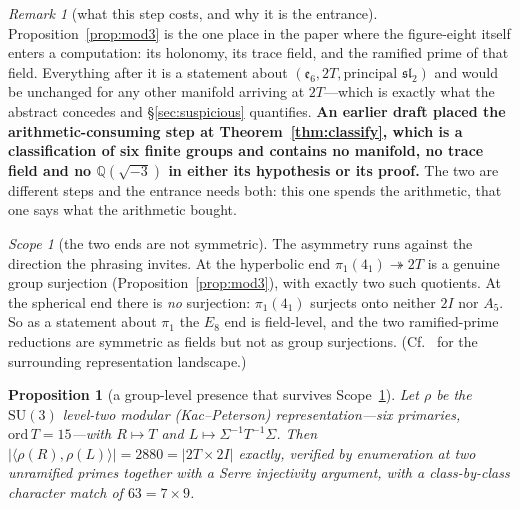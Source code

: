 \documentclass[11pt,reqno]{amsart}
\theoremstyle{plain}
\newtheorem{proposition}[theorem]{Proposition}
\theoremstyle{definition}
\theoremstyle{remark}
\newtheorem{scope}[theorem]{Scope}
\newtheorem{remark}[theorem]{Remark}
\newcommand{\Q}{\mathbb{Q}}
\newcommand{\sll}{\mathfrak{sl}}
\newcommand{\ee}{\mathfrak{e}}
\begin{document}
\begin{remark}[what this step costs, and why it is the entrance]\label{rk:entrance-cost}
Proposition~\ref{prop:mod3} is the one place in the paper where the figure-eight itself
enters a computation: its holonomy, its trace field, and the ramified prime of that
field. Everything after it is a statement about $(\ee_6,2T,\text{principal }\sll_2)$ and
would be unchanged for any other manifold arriving at $2T$---which is exactly what the
abstract concedes and \S\ref{sec:suspicious} quantifies. \textbf{An earlier draft placed
the arithmetic-consuming step at Theorem~\ref{thm:classify}, which is a classification of
six finite groups and contains no manifold, no trace field and no $\Q(\sqrt{-3})$ in
either its hypothesis or its proof.} The two are different steps and the entrance needs
both: this one spends the arithmetic, that one says what the arithmetic bought.
\end{remark}

\begin{scope}[the two ends are not symmetric]\label{sc:asym}
The asymmetry runs against the direction the phrasing invites. At the hyperbolic end
$\pi_1(4_1)\twoheadrightarrow 2T$ is a genuine group surjection
(Proposition~\ref{prop:mod3}), with exactly two such
quotients. At the spherical end there is \emph{no} surjection: $\pi_1(4_1)$ surjects
onto neither $2I$ nor $A_5$. So as a statement about $\pi_1$ the $E_8$ end is
field-level, and the two ramified-prime reductions are symmetric as fields but not as
group surjections. (Cf.~\cite{Stuebner} for the surrounding representation landscape.)
\end{scope}

\begin{proposition}[a group-level presence that survives Scope~\ref{sc:asym}]\label{prop:2880}
Let $\rho$ be the $\mathrm{SU}(3)$ level-two modular (Kac--Peterson) representation---six
primaries, $\mathrm{ord}\,T=15$---with $R\mapsto T$ and $L\mapsto \Sigma^{-1}T^{-1}\Sigma$.
Then $|\langle\rho(R),\rho(L)\rangle|=2880=|2T\times2I|$ exactly,
verified by enumeration at two unramified primes together with a Serre injectivity
argument, with a class-by-class character match of $63=7\times9$.
\end{proposition}
\end{document}
